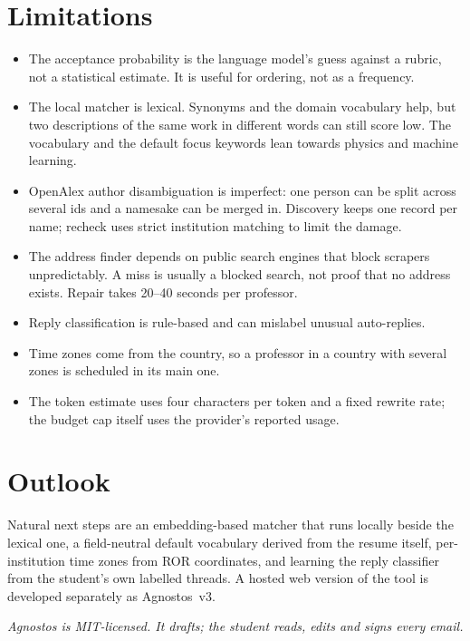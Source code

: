 \documentclass[11pt,a4paper]{article}
\begin{document}
\section{Limitations}

\begin{itemize}
  \item The acceptance probability is the language model's guess against a rubric, not a
        statistical estimate. It is useful for ordering, not as a frequency.
  \item The local matcher is lexical. Synonyms and the domain vocabulary help, but two
        descriptions of the same work in different words can still score low. The vocabulary
        and the default focus keywords lean towards physics and machine learning.
  \item OpenAlex author disambiguation is imperfect: one person can be split across several ids
        and a namesake can be merged in. Discovery keeps one record per name; recheck uses
        strict institution matching to limit the damage.
  \item The address finder depends on public search engines that block scrapers unpredictably.
        A miss is usually a blocked search, not proof that no address exists. Repair takes 20--40
        seconds per professor.
  \item Reply classification is rule-based and can mislabel unusual auto-replies.
  \item Time zones come from the country, so a professor in a country with several zones is
        scheduled in its main one.
  \item The token estimate uses four characters per token and a fixed rewrite rate; the budget
        cap itself uses the provider's reported usage.
\end{itemize}

\section{Outlook}

Natural next steps are an embedding-based matcher that runs locally beside the lexical one, a
field-neutral default vocabulary derived from the resume itself, per-institution time zones from
ROR coordinates, and learning the reply classifier from the student's own labelled threads. A
hosted web version of the tool is developed separately as Agnostos~v3.

\vspace{1em}
\noindent\textit{Agnostos is MIT-licensed. It drafts; the student reads, edits and signs every
email.}
\end{document}
